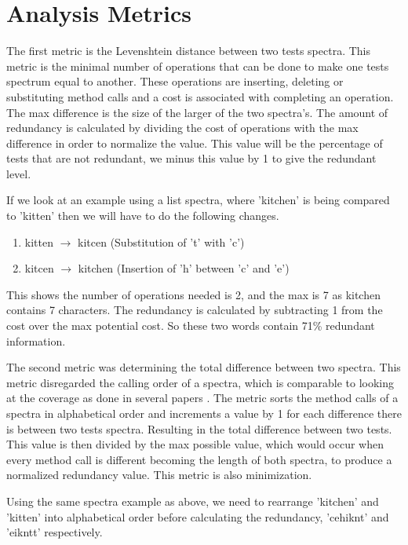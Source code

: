 \section{Analysis Metrics}
\label{S:metrics}

The first metric is the Levenshtein distance between two tests spectra. This metric is the minimal number of operations that can be done to make one tests spectrum equal to another. These operations are inserting, deleting or substituting method calls and a cost is associated with completing an operation. The max difference is the size of the larger of the two spectra's. The amount of redundancy is calculated by dividing the cost of operations with the max difference in order to normalize the value. This value will be the percentage of tests that are not redundant, we minus this value by 1 to give the redundant level.

If we look at an example using a list spectra, where 'kitchen' is being compared to 'kitten' then we will have to do the following changes.

\begin{enumerate}
\item kitten $\rightarrow$ kitcen (Substitution of 't' with 'c')
\item kitcen $\rightarrow$ kitchen (Insertion of 'h' between 'c' and 'e')
\end{enumerate}

This shows the number of operations needed is 2, and the max is 7 as kitchen contains 7 characters. The redundancy is calculated by subtracting 1 from the cost over the max potential cost. So these two words contain 71\% redundant information. 

The second metric was determining the total difference between two spectra. This metric disregarded the calling order of a spectra, which is comparable to looking at the coverage as done in several papers \cite{fraser2007redundancy,koochakzadeh2009test,zhang2011empirical,jeffrey2005test}. The metric sorts the method calls of a spectra in alphabetical order and increments a value by 1 for each difference there is between two tests spectra. Resulting in the total difference between two tests. This value is then divided by the max possible value, which would occur when every method call is different becoming the length of both spectra, to produce a normalized redundancy value. This metric is also minimization.

Using the same spectra example as above, we need to rearrange 'kitchen' and 'kitten' into alphabetical order before calculating the redundancy, 'cehiknt' and 'eikntt' respectively.

